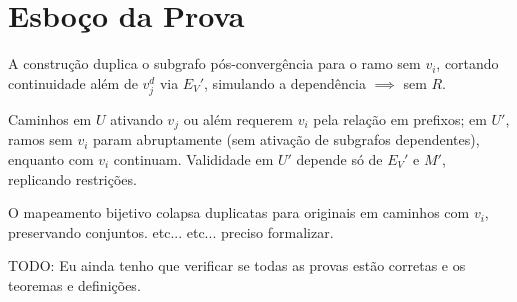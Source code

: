 \documentclass{article}
\begin{document}
\section{Esboço da Prova}

A construção duplica o subgrafo pós-convergência para o ramo sem \( v_i \), cortando continuidade além de \( v_j^d \) via \( E_V' \), simulando a dependência \( \implies \) sem \( R \).

Caminhos em \( U \) ativando \( v_j \) ou além requerem \( v_i \) pela relação em prefixos; em \( U' \), ramos sem \( v_i \) param abruptamente (sem ativação de subgrafos dependentes), enquanto com \( v_i \) continuam. Valididade em \( U' \) depende só de \( E_V' \) e \( M' \), replicando restrições.

O mapeamento bijetivo colapsa duplicatas para originais em caminhos com \( v_i \), preservando conjuntos. etc... etc... preciso formalizar.

\bigskip

TODO: Eu ainda tenho que verificar se todas as provas estão corretas e os teoremas e definições.
\end{document}
